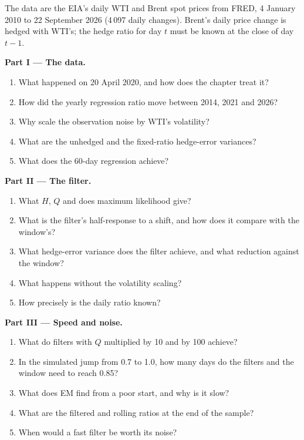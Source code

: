 \begin{problem}\label{pb:qm:state-space-models-and-the-kalman-filter:1}
The data are the EIA's daily WTI and Brent spot prices from FRED, 4 January 2010 to 22 September 2026 (4\,097 daily changes). Brent's daily price change is
hedged with WTI's; the hedge ratio for day $t$ must be known at the close of day $t - 1$.

\medskip\noindent\textbf{Part I --- The data.}
\begin{enumerate}
\item What happened on 20 April 2020, and how does the chapter treat it?
\item How did the yearly regression ratio move between 2014, 2021 and 2026?
\item Why scale the observation noise by WTI's volatility?
\item What are the unhedged and the fixed-ratio hedge-error variances?
\item What does the 60-day regression achieve?
\end{enumerate}

\medskip\noindent\textbf{Part II --- The filter.}
\begin{enumerate}[resume]
\item What $H$, $Q$ and  does maximum likelihood give?
\item What is the filter's half-response to a shift, and how does it compare with the window's?
\item What hedge-error variance does the filter achieve, and what reduction against the window?
\item What happens without the volatility scaling?
\item How precisely is the daily ratio known?
\end{enumerate}

\medskip\noindent\textbf{Part III --- Speed and noise.}
\begin{enumerate}[resume]
\item What do filters with $Q$ multiplied by 10 and by 100 achieve?
\item In the simulated jump from 0.7 to 1.0, how many days do the filters and the window need to reach 0.85?
\item What does EM find from a poor start, and why is it slow?
\item What are the filtered and rolling ratios at the end of the sample?
\item When would a fast filter be worth its noise?
\end{enumerate}


\end{problem}
